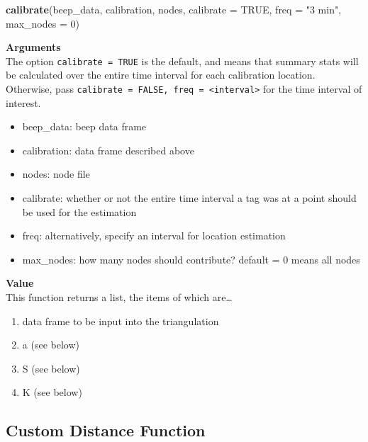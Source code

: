 \documentclass[
]{book}
\newenvironment{Shaded}{\begin{snugshade}}{\end{snugshade}}
\newcommand{\AttributeTok}[1]{\textcolor[rgb]{0.13,0.29,0.53}{#1}}
\newcommand{\ConstantTok}[1]{\textcolor[rgb]{0.56,0.35,0.01}{#1}}
\newcommand{\DecValTok}[1]{\textcolor[rgb]{0.00,0.00,0.81}{#1}}
\newcommand{\FunctionTok}[1]{\textcolor[rgb]{0.13,0.29,0.53}{\textbf{#1}}}
\newcommand{\NormalTok}[1]{#1}
\newcommand{\StringTok}[1]{\textcolor[rgb]{0.31,0.60,0.02}{#1}}
\providecommand{\tightlist}{%
  \setlength{\itemsep}{0pt}\setlength{\parskip}{0pt}}
\begin{document}
\begin{Shaded}
\begin{Highlighting}[]
\FunctionTok{calibrate}\NormalTok{(beep\_data, calibration, nodes, }\AttributeTok{calibrate =} \ConstantTok{TRUE}\NormalTok{, }\AttributeTok{freq =} \StringTok{"3 min"}\NormalTok{, }\AttributeTok{max\_nodes =} \DecValTok{0}\NormalTok{)}
\end{Highlighting}
\end{Shaded}

\textbf{Arguments}\\
The option \texttt{calibrate\ =\ TRUE} is the default, and means that summary stats will be calculated over the entire time interval for each calibration location. Otherwise, pass \texttt{calibrate\ =\ FALSE,\ freq\ =\ \textless{}interval\textgreater{}} for the time interval of interest.

\begin{itemize}
\tightlist
\item
  beep\_data: beep data frame\\
\item
  calibration: data frame described above\\
\item
  nodes: node file\\
\item
  calibrate: whether or not the entire time interval a tag was at a point should be used for the estimation
\item
  freq: alternatively, specify an interval for location estimation
\item
  max\_nodes: how many nodes should contribute? default = 0 means all nodes
\end{itemize}

\textbf{Value}\\
This function returns a list, the items of which are\ldots{}

\begin{enumerate}
\def\labelenumi{\arabic{enumi}.}
\tightlist
\item
  data frame to be input into the triangulation\\
\item
  a (see below)\\
\item
  S (see below)\\
\item
  K (see below)
\end{enumerate}

\subsection{Custom Distance Function}\label{custom-distance-function}
\end{document}
